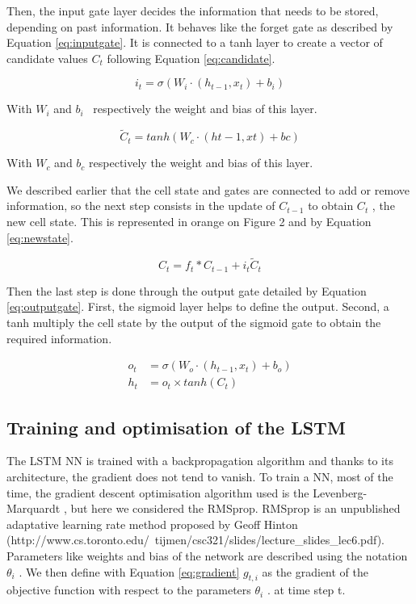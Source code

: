 Then, the input gate layer decides the information that needs to be stored, depending on past information. 
It behaves like the forget gate as described by Equation \ref{eq:inputgate}. It is connected to a 
tanh layer to create a vector of candidate values \(  C_{t} \)  following Equation \ref{eq:candidate}.


\begin{equation}\label{eq:inputgate}
 i_{t} = \sigma  \left(W_i \cdot \left( h_{t-1}, x_t \right) + b_i \right)
\end{equation}


With  \( W_{i} \)  and  \( b_{i} \) \  respectively the weight and bias of this layer. 

\begin{equation}\label{eq:candidate}
 \tilde{C}_{t} = tanh \left( W_{c} \cdot  \left( ht-1,xt \right) +bc \right)
\end{equation}


With  \( W_{c} \)  and  \( b_{c} \)  respectively the weight and bias of this layer. 


We described earlier that the cell state and gates are connected to add or remove information, 
so the next step consists in the update of  \( C_{t-1} \) to obtain  \( C_{t} \) , 
the new cell state. This is represented in orange on Figure 2 and by Equation \ref{eq:newstate}. 



\begin{equation}\label{eq:newstate}
 C_{t} = f_{t} \ast C_{t-1} + i_{t}\tilde{C}_{t}
\end{equation}

Then the last step is done through the output gate detailed by Equation \ref{eq:outputgate}. First, the sigmoid layer 
helps to define the output. Second, a tanh multiply the cell state by the output of the sigmoid gate to 
obtain the required information.


\begin{align} \label{eq:outputgate}
	o_t &= \sigma \left( W_{o} \cdot (h_{t-1}, x_t) + b_{o} \right) \\
	h_t &= o_t \times tanh(C_t)
\end{align}

\subsection{Training and optimisation of the LSTM}


The LSTM NN is trained with a backpropagation algorithm and thanks to its architecture, 
the gradient does not tend to vanish. To train a NN, most of the time, the gradient descent 
optimisation algorithm used is the Levenberg-Marquardt \cite{marquardt1963algorithm}, but here we 
considered the RMSprop. RMSprop is an unpublished adaptative learning rate method proposed by 
Geoff Hinton (http://www.cs.toronto.edu/~tijmen/csc321/slides/lecture\_slides\_lec6.pdf). 
Parameters like weights and bias of the network are described using the notation  \(  \theta _{i} \) . 
We then define with Equation \ref{eq:gradient}  \( g_{t,i} \)  as the gradient of the 
objective function with respect to the parameters \(   \theta _{i} \) . at time step t. 


